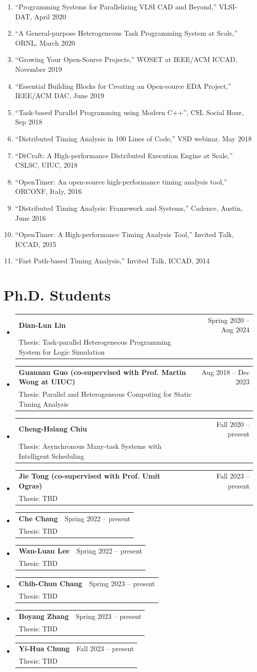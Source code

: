 \documentclass[A4,11pt]{article}
\makeatletter
\newcommand{\CVSubheading}[4]{
  \vspace{-2pt}\item
    \begin{tabular*}{0.97\textwidth}[t]{l@{\extracolsep{\fill}}r}
      \textbf{#1} & #2 \\
      \small#3 & \small #4 \\
    \end{tabular*}\vspace{-7pt}
}
\newcommand{\CVSubHeadingListStart}{\begin{itemize}[leftmargin=0.5cm, label={}]}
\newcommand{\CVSubHeadingListEnd}{\end{itemize}}
\makeatother
\begin{document}
\begin{enumerate}
  \item ``Programming Systems for Parallelizing VLSI CAD and Beyond,'' VLSI-DAT, April 2020
  \item ``A General-purpose Heterogeneous Task Programming System at Scale,'' ORNL, March 2020
  \item ``Growing Your Open-Source Projects,'' WOSET at IEEE/ACM ICCAD, November 2019
  \item ``Essential Building Blocks for Creating an Open-source EDA Project,'' IEEE/ACM DAC, June 2019
  \item ``Task-based Parallel Programming using Modern C++'', CSL Social Hour, Sep 2018
  \item ``Distributed Timing Analysis in 100 Lines of Code,'' VSD webinar, May 2018
  \item ``DtCraft: A High-performance Distributed Execution Engine at Scale,'' CSLSC, UIUC, 2018
  \item ``OpenTimer: An open-source high-performance timing analysis tool,'' ORCONF, Italy, 2016
  \item ``Distributed Timing Analysis: Framework and Systems,'' Cadence, Austin, June 2016
  \item ``OpenTimer: A High-performance Timing Analysis Tool,'' Invited Talk, ICCAD, 2015
  \item ``Fast Path-based Timing Analysis,'' Invited Talk, ICCAD, 2014

 \end{enumerate}

\section{Ph.D. Students}
  \CVSubHeadingListStart
    \CVSubheading
      {{Dian-Lun Lin}}{Spring 2020 -- Aug 2024}
      {Thesis: Task-parallel Heterogeneous Programming System for Logic Simulation}{}
    \CVSubheading
      {{Guannan Guo (co-supervised with Prof. Martin Wong at UIUC)}}{Aug 2018 -- Dec 2023}
      {Thesis: Parallel and Heterogeneous Computing for Static Timing Analysis}{}
    \CVSubheading
      {{Cheng-Hsiang Chiu}}{Fall 2020 -- present}
      {Thesis: Asynchronous Many-task Systems with Intelligent Scheduling}{}
    \CVSubheading
      {{Jie Tong (co-supervised with Prof. Umit Ogras)}}{Fall 2023 -- present}
      {Thesis: TBD}{}
    \CVSubheading
      {{Che Chang}}{Spring 2022 -- present}
      {Thesis: TBD}{}
    \CVSubheading
      {{Wan-Luan Lee}}{Spring 2022 -- present}
      {Thesis: TBD}{}
    \CVSubheading
      {{Chih-Chun Chang}}{Spring 2023 -- present}
      {Thesis: TBD}{}
    \CVSubheading
      {{Boyang Zhang}}{Spring 2023 -- present}
      {Thesis: TBD}{}
    \CVSubheading
      {{Yi-Hua Chung}}{Fall 2023 -- present}
      {Thesis: TBD}{}
  \CVSubHeadingListEnd
\end{document}
